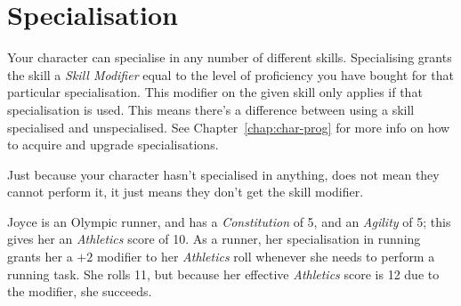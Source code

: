 \section{Specialisation}\label{sec:specialisation}
Your character can specialise in any number of different skills.
Specialising grants the skill a \textit{Skill Modifier} equal to the level of proficiency you have bought for that particular specialisation.
This modifier on the given skill only applies if that specialisation is used.
This means there's a difference between using a skill specialised and unspecialised.
See Chapter~\ref{chap:char-prog} for more info on how to acquire and upgrade specialisations.

\begin{note} 
    Just because your character hasn't specialised in anything, does not mean they cannot perform it, it just means they don't get the skill modifier.
\end{note}

\begin{example}
    Joyce is an Olympic runner, and has a \textit{Constitution} of 5, and an \textit{Agility} of 5; this gives her an \textit{Athletics} score of 10. 
    As a runner, her specialisation in running grants her a $+2$ modifier to her \textit{Athletics} roll whenever she needs to perform a running task.
    She rolls 11, but because her effective \textit{Athletics} score is 12 due to the modifier, she succeeds.
\end{example}